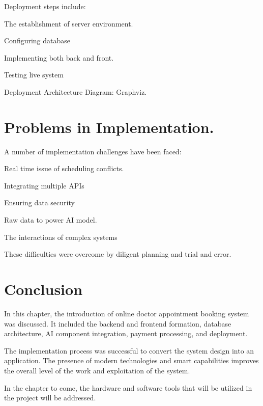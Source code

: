 Deployment steps include:

The establishment of server environment.

Configuring database

Implementing both back and front.

Testing live system

Deployment Architecture Diagram: Graphviz.

\section{Problems in Implementation.}

A number of implementation challenges have been faced:

Real time issue of scheduling conflicts.

Integrating multiple APIs

Ensuring data security

Raw data to power AI model.

The interactions of complex systems

These difficulties were overcome by diligent planning and trial and error.

\section{Conclusion}

In this chapter, the introduction of online doctor appointment booking system was discussed. It included the backend and frontend formation, database architecture, AI component integration, payment processing, and deployment.

The implementation process was successful to convert the system design into an application. The presence of modern technologies and smart capabilities improves the overall level of the work and exploitation of the system.

In the chapter to come, the hardware and software tools that will be utilized in the project will be addressed.
